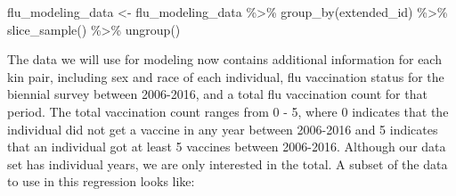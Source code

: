 \documentclass[10pt,a4paper,onecolumn]{article}
\newenvironment{Shaded}{\begin{snugshade}}{\end{snugshade}}
\newcommand{\FunctionTok}[1]{\textcolor[rgb]{0.00,0.00,0.00}{#1}}
\newcommand{\NormalTok}[1]{#1}
\newcommand{\OtherTok}[1]{\textcolor[rgb]{0.56,0.35,0.01}{#1}}
\newcommand{\SpecialCharTok}[1]{\textcolor[rgb]{0.00,0.00,0.00}{#1}}
\begin{document}
\begin{Shaded}
\begin{Highlighting}[]
\NormalTok{flu\_modeling\_data }\OtherTok{\textless{}{-}}\NormalTok{ flu\_modeling\_data }\SpecialCharTok{\%\textgreater{}\%}
  \FunctionTok{group\_by}\NormalTok{(extended\_id) }\SpecialCharTok{\%\textgreater{}\%}
  \FunctionTok{slice\_sample}\NormalTok{() }\SpecialCharTok{\%\textgreater{}\%}
  \FunctionTok{ungroup}\NormalTok{()}
\end{Highlighting}
\end{Shaded}

The data we will use for modeling now contains additional information
for each kin pair, including sex and race of each individual, flu
vaccination status for the biennial survey between 2006-2016, and a
total flu vaccination count for that period. The total vaccination count
ranges from 0 - 5, where 0 indicates that the individual did not get a
vaccine in any year between 2006-2016 and 5 indicates that an individual
got at least 5 vaccines between 2006-2016. Although our data set has
individual years, we are only interested in the total. A subset of the
data to use in this regression looks like:
\end{document}

